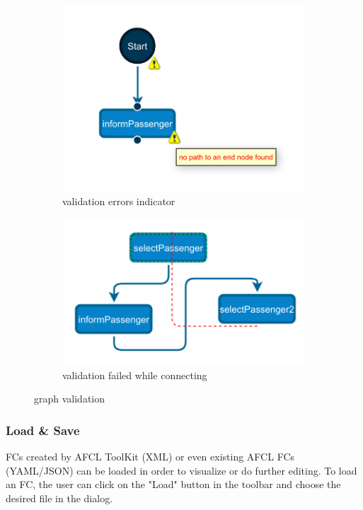 \documentclass[a4paper,top=25mm,bottom=25mm,12pt,pdftex,halfparskip,twoside,openany,bibtotoc,numbers=noenddot]{scrbook}
\begin{document}
\begin{figure}
\centering
\begin{subfigure}{.4\textwidth}
  \centering
  \includegraphics[width=.8\linewidth]{validate1}
  \caption{validation errors indicator}
  \label{fig:cell-validation-a}
\end{subfigure}
\begin{subfigure}{.4\textwidth}
  \centering
  \includegraphics[width=.8\linewidth]{validate2}
  \caption{validation failed while connecting}
  \label{fig:cell-validation-b}
\end{subfigure}
\caption{graph validation}
\label{fig:cell-validation}
\end{figure}

\subsubsection{Load \& Save}

FCs created by AFCL ToolKit (XML) or even existing AFCL FCs (YAML/JSON) can be loaded in order to visualize or do further editing. To load an FC, the user can click on the "Load" button in the toolbar and choose the desired file in the dialog.
\end{document}
